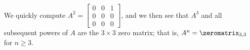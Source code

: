 We quickly compute 
$A^2 = \begin{bmatrix} 0 & 0 & 1\\ 0 & 0 & 0\\ 0 & 0 & 0\end{bmatrix}$, 
and we then see that 
$A^3$ and all subsequent powers of $A$ are the $3 \times 3$ zero matrix;  
that is, $A^n = \zeromatrix_{3,3}$ for $n\ge 3$. 